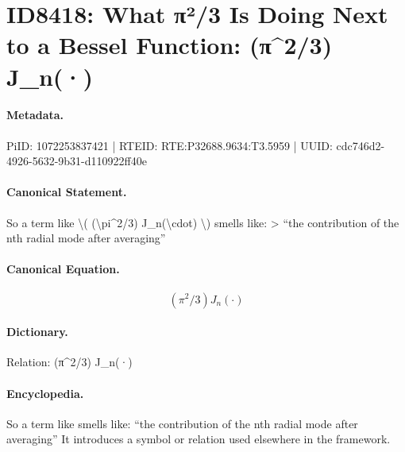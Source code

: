 \section*{ID8418: What π²/3 Is Doing Next to a Bessel Function: (π\textasciicircum{}2/3) J\_n(·)}
\paragraph{Metadata.}
PiID: 1072253837421 | RTEID: RTE:P32688.9634:T3.5959 | UUID: cdc746d2-4926-5632-9b31-d110922ff40e

\paragraph{Canonical Statement.}
So a term like \textbackslash{}( (\textbackslash{}pi\textasciicircum{}2/3) J\_n(\textbackslash{}cdot) \textbackslash{}) smells like: > “the contribution of the nth radial mode after averaging”

\paragraph{Canonical Equation.}
\[
(\pi^2/3) J_n(\cdot)
\]

\paragraph{Dictionary.}
Relation: (π\textasciicircum{}2/3) J\_n(·)

\paragraph{Encyclopedia.}
So a term like smells like: “the contribution of the nth radial mode after averaging” It introduces a symbol or relation used elsewhere in the framework.
